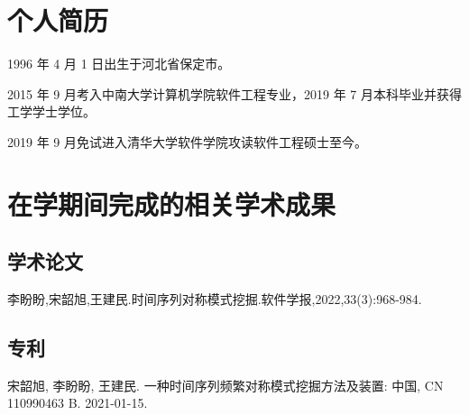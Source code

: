 
\begin{resume}

  \section*{个人简历}

  1996 年 4 月 1 日出生于河北省保定市。

  2015 年 9 月考入中南大学计算机学院软件工程专业，2019 年 7 月本科毕业并获得工学学士学位。

  2019 年 9 月免试进入清华大学软件学院攻读软件工程硕士至今。


  \section*{在学期间完成的相关学术成果}

  \subsection*{学术论文}

  \begin{achievements}
    \item 李盼盼,宋韶旭,王建民.时间序列对称模式挖掘.软件学报,2022,33(3):968-984.
  \end{achievements}


  \subsection*{专利}

  \begin{achievements}
    \item 宋韶旭, 李盼盼, 王建民. 一种时间序列频繁对称模式挖掘方法及装置: 中国, CN 110990463 B. 2021-01-15.
  \end{achievements}

\end{resume}
